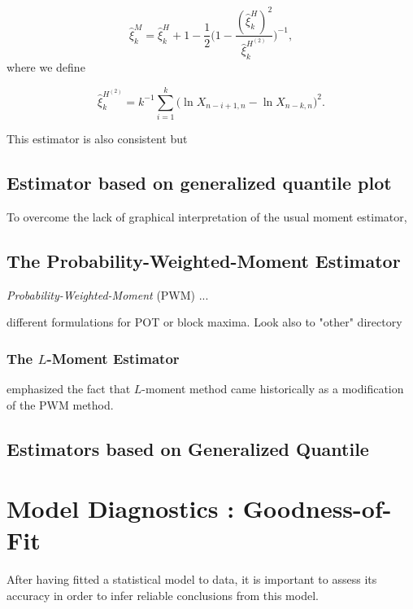 \documentclass[11pt,a4paper,openany ]{book}
\begin{document}
\begin{equation}
\hat{\xi}^M_k=\hat{\xi}_k^H+1-\frac{1}{2}\Bigg(1-\frac{(\hat{\xi}_k^H)^2}{\hat{\xi}^{H^{(2)}}_k }\Bigg)^{-1},
\end{equation}
where we define 

\begin{equation*}
\hat{\xi}^{H^{(2)}}_k=k^{-1}\sum_{i=1}^k\big(\ln X_{n-i+1,n}-\ln X_{n-k,n}\big)^2.
\end{equation*}


This estimator is also consistent but  


\subsection*{Estimator based on generalized quantile plot}

To overcome the lack of graphical interpretation of the usual moment estimator, 




\subsection{The Probability-Weighted-Moment Estimator}

\emph{Probability-Weighted-Moment} (PWM)
...

different formulations for POT or block maxima. Look also to "other" directory
\cite{ribereau_skew_2016}


\subsubsection*{The $L$-Moment Estimator}
\cite{wang_lh_1997}

\cite{hosking_regional_1997} emphasized the fact that $L$-moment method came historically as a modification of the PWM method. 

\subsection{Estimators based on Generalized Quantile }




\section{Model Diagnostics : Goodness-of-Fit}

After having fitted a statistical model to data, it is important to assess its accuracy in order to infer reliable conclusions from this model.
\end{document}
